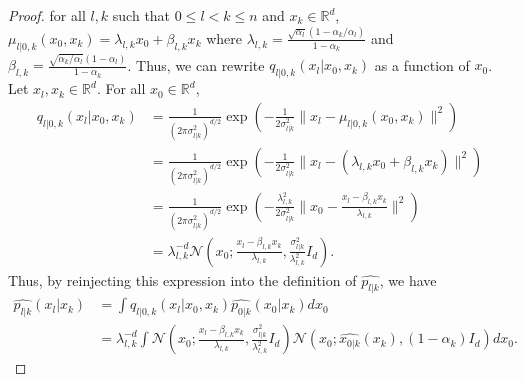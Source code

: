 \documentclass[12pt]{article}
\begin{document}
\begin{proof}
    for all $l,k$ such that $0 \leq l < k \leq n$ and $x_k \in \mathbb{R}^d$, 
    $\mu_{l|0,k}(x_0, x_k) = \lambda_{l,k}x_0 + \beta_{l,k}x_k$ 
    where $\lambda_{l,k} = \frac{\sqrt{\alpha_l}(1 - \alpha_k/\alpha_l)}{1 - \alpha_k}$
    and $\beta_{l,k} = \frac{\sqrt{\alpha_k/\alpha_l}( 1- \alpha_l)}{1- \alpha_k}$.
    Thus, we can rewrite $q_{l|0,k}( x_l | x_0, x_k)$ as a function of $x_0$.
    Let $x_l, x_k \in \mathbb{R}^d$. For all $x_0 \in \mathbb{R}^d$,
    \begin{align*}
        q_{l|0,k}( x_l | x_0, x_k)
        &= \frac{1}{(2 \pi \sigma^2_{l|k})^{d/2}} 
        \exp\left( - \frac{1}{2 \sigma^2_{l|k}} \| x_l - \mu_{l|0,k}(x_0, x_k) \|^2 \right)\\
        &= \frac{1}{(2 \pi \sigma^2_{l|k})^{d/2}} 
        \exp\left( - \frac{1}{2 \sigma^2_{l|k}} \| x_l - (\lambda_{l,k}x_0 + \beta_{l,k}x_k) \|^2 \right) \\
        &= \frac{1}{(2 \pi \sigma^2_{l|k})^{d/2}} 
        \exp\left( - \frac{\lambda_{l,k}^2}{2 \sigma^2_{l|k}} \| x_0 - \frac{x_l - \beta_{l,k}x_k}{\lambda_{l,k}} \|^2 \right)\\
        &= \lambda_{l,k}^{-d} \mathcal{N}(x_0; \frac{x_l - \beta_{l,k}x_k}{\lambda_{l,k}}, \frac{\sigma^2_{l|k}}{\lambda_{l,k}^2} I_d).
    \end{align*}
    Thus, by reinjecting this expression into the definition of $\hat{p_{l|k}}$, we have
    \begin{align*}
        \hat{p_{l|k}}(x_l | x_k)
        & = \int q_{l|0,k}(x_l | x_0, x_k) \hat{p_{0|k}}(x_0 | x_k) dx_0 \\
        & = \lambda_{l,k}^{-d} \int
        \mathcal{N}(x_0; \frac{x_l - \beta_{l,k}x_k}{\lambda_{l,k}}, \frac{\sigma^2_{l|k}}{\lambda_{l,k}^2} I_d) 
        \mathcal{N}(x_0; \hat{x_{0|k}}(x_k), (1 - \alpha_k) I_d) dx_0.
    \end{align*}


\end{proof}
\end{document}
